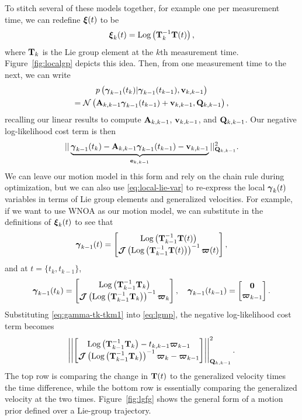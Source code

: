 To stitch several of these models together, for example one per measurement time, we can redefine ${\boldsymbol{\xi}}(t)$ to be
\begin{equation}\label{eq:local-lie-var}
{\boldsymbol{\xi}}_k(t) = \mbox{Log} \left(\mathbf{T}_k^{-1} \mathbf{T}(t)\right),
\end{equation}
where $\mathbf{T}_k$ is the Lie group element at the $k$th measurement time.  Figure~\ref{fig:localgp} depicts this idea.  Then, from one measurement time to the next, we can write
\begin{multline}
p\left({\boldsymbol{\gamma}}_{k-1}(t_k) | {\boldsymbol{\gamma}}_{k-1}(t_{k-1}), \mathbf{v}_{k,k-1}\right) \\ = \mathcal{N}\left( \mathbf{A}_{k,k-1} {\boldsymbol{\gamma}}_{k-1}(t_{k-1}) + \mathbf{v}_{k,k-1}, \mathbf{Q}_{k,k-1}\right),
\end{multline}
recalling our linear results to compute $\mathbf{A}_{k,k-1}$, $\mathbf{v}_{k,k-1}$, and $\mathbf{Q}_{k,k-1}$.  Our negative log-likelihood cost term is then
\begin{equation}\label{eq:lgmp}
|| \underbrace{{\boldsymbol{\gamma}}_{k-1}(t_k) - \mathbf{A}_{k,k-1} {\boldsymbol{\gamma}}_{k-1}(t_{k-1}) - \mathbf{v}_{k,k-1}}_{\mathbf{e}_{k,k-1}} ||_{\mathbf{Q}_{k,k-1}}^2.
\end{equation}
We can leave our motion model in this form and rely on the chain rule during optimization, but we can also use \eqref{eq:local-lie-var} to re-express the local ${\boldsymbol{\gamma}}_k(t)$ variables in terms of Lie group elements and generalized velocities.  For example, if we want to use \ac{WNOA} as our motion model, we can substitute in the definitions of ${\boldsymbol{\xi}}_k(t)$ to see that
\begin{equation}
{\boldsymbol{\gamma}}_{k-1}(t) = \begin{bmatrix} \mbox{Log} \left(\mathbf{T}_{k-1}^{-1} \mathbf{T}(t)\right) \\ {\boldsymbol{\mathcal{J}}}\left(\mbox{Log} \left(\mathbf{T}_{k-1}^{-1} \mathbf{T}(t)\right)\right)^{-1} {\boldsymbol{\varpi}}(t) \end{bmatrix},
\end{equation}
and at $t=\{t_k, t_{k-1}\}$,
\begin{equation}\label{eq:gamma-tk-tkm1}
{\boldsymbol{\gamma}}_{k-1}(t_k) = \begin{bmatrix} \mbox{Log} \left(\mathbf{T}_{k-1}^{-1} \mathbf{T}_k\right) \\ {\boldsymbol{\mathcal{J}}}\left(\mbox{Log} \left(\mathbf{T}_{k-1}^{-1} \mathbf{T}_k\right)\right)^{-1} {\boldsymbol{\varpi}}_k \end{bmatrix}, \quad {\boldsymbol{\gamma}}_{k-1}(t_{k-1}) = \begin{bmatrix} \mathbf{0} \\ {\boldsymbol{\varpi}}_{k-1} \end{bmatrix}.
\end{equation}
Substituting \eqref{eq:gamma-tk-tkm1} into \eqref{eq:lgmp}, the negative log-likelihood cost term becomes
\begin{equation}
\left|\left| \begin{bmatrix} \mbox{Log} \left(\mathbf{T}_{k-1}^{-1} \mathbf{T}_k\right) - t_{k,k-1} {\boldsymbol{\varpi}}_{k-1} \\ {\boldsymbol{\mathcal{J}}}\left(\mbox{Log} \left(\mathbf{T}_{k-1}^{-1} \mathbf{T}_k\right)\right)^{-1} {\boldsymbol{\varpi}}_k - {\boldsymbol{\varpi}}_{k-1} \end{bmatrix} \right|\right|_{\mathbf{Q}_{k,k-1}}^2.
\end{equation}
The top row is comparing the change in $\mathbf{T}(t)$ to the generalized velocity times the time difference, while the bottom row is essentially comparing the generalized velocity at the two times.  Figure~\ref{fig:lgfg} shows the general form of a motion prior defined over a Lie-group trajectory.

